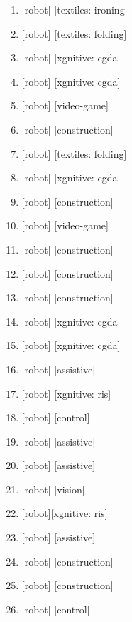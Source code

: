 \documentclass{article}
\begin{document}
\begin{enumerate}
  \item {} [robot] [textiles: ironing]
  \item {} [robot] [textiles: folding]
  \item {} [robot] [xgnitive: cgda]
  \item {} [robot] [xgnitive: cgda]
  \item {} [robot] [video-game]
  \item {} [robot] [construction]
  \item {} [robot] [textiles: folding]
  \item {} [robot] [xgnitive: cgda]
  \item {} [robot] [construction]
  \item {} [robot] [video-game]
  \item {} [robot] [construction]
  \item {} [robot] [construction]
  \item {} [robot] [construction]
  \item {} [robot] [xgnitive: cgda]
  \item {} [robot] [xgnitive: cgda]
  \item {} [robot] [assistive]
  \item {} [robot] [xgnitive: ris]
  \item {} [robot] [control]
  \item {} [robot] [assistive]
  \item {} [robot] [assistive]
  \item {} [robot] [vision]
  \item {} [robot][xgnitive: ris]
  \item {} [robot]  [assistive]
  \item {} [robot] [construction]
  \item {} [robot] [construction]
  \item {} [robot] [control]

\end{enumerate}
\end{document}
